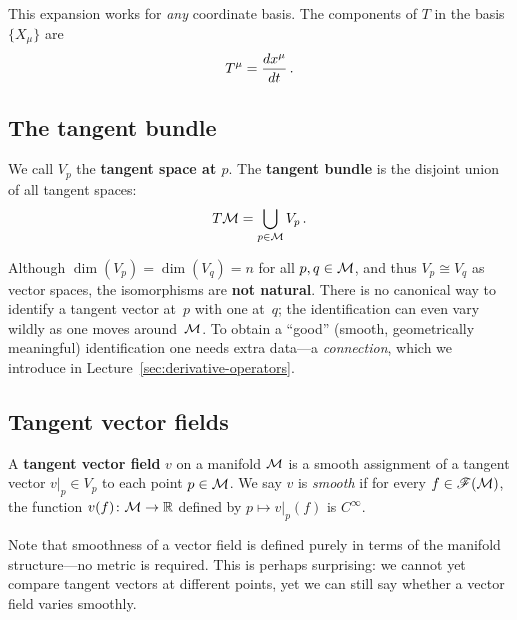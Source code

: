 This expansion works for \emph{any} coordinate basis.  The components
of $T$ in the basis $\{X_\mu\}$ are
\begin{equation}\label{eq:tangent-components}
  T^\mu = \frac{d x^\mu}{d t}\,.
\end{equation}

\subsection{The tangent bundle}\label{sec:tangent-bundle}

We call $V_p$ the \textbf{tangent space at $p$}.  The
\textbf{tangent bundle} is the disjoint union of all tangent spaces:
\begin{equation}\label{eq:tangent-bundle}
  T\mathcal{M} = \bigcup_{p\in\mathcal{M}} V_p\,.
\end{equation}

\begin{remark}
  Although $\dim(V_p) = \dim(V_q) = n$ for all $p,q\in\mathcal{M}$, and thus
  $V_p \cong V_q$ as vector spaces, the isomorphisms are
  \textbf{not natural}.  There is no canonical way to identify a
  tangent vector at~$p$ with one at~$q$; the identification can
  even vary wildly as one moves around~$\mathcal{M}$.  To obtain a ``good''
  (smooth, geometrically meaningful) identification one needs extra
  data---a \emph{connection}, which we introduce in
  Lecture~\ref{sec:derivative-operators}.
\end{remark}

\subsection{Tangent vector fields}\label{sec:vector-fields}

\begin{definition}\label{def:vector-field}
  A \textbf{tangent vector field} $v$ on a manifold $\mathcal{M}$ is a smooth
  assignment of a tangent vector $v|_p \in V_p$ to each point
  $p\in\mathcal{M}$.  We say $v$ is \emph{smooth} if for every
  $f\in\mathscr{F}(\mathcal{M})$, the function $v(f)\colon\mathcal{M}\to\mathbb{R}$ defined
  by $p\mapsto v|_p(f)$ is $C^\infty$.
\end{definition}

Note that smoothness of a vector field is defined purely in terms of
the manifold structure---no metric is required.  This is perhaps
surprising: we cannot yet compare tangent vectors at different
points, yet we can still say whether a vector field varies smoothly.

